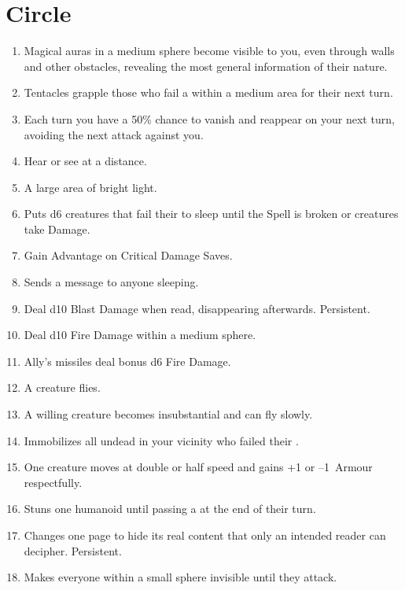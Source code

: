 \documentclass[itdr]{subfiles}
\begin{document}
\section{ Circle}
\def \spellcircle {3}
\begin{enumerate}
	\item {} Magical auras in a medium sphere become visible to you, even through walls and other obstacles, revealing the most general information of their nature.
	\item {} Tentacles grapple those who fail a  within a medium area for their next turn.
	\item {} Each turn you have a 50\% chance to vanish and reappear on your next turn, avoiding the next attack against you.
	\item {} Hear or see at a distance.
	\item {} A large area of bright light.
	\item {} Puts d6 creatures that fail their  to sleep until the Spell is broken or creatures take Damage.
	\item {} Gain Advantage on Critical Damage Saves.
	\item {} Sends a message to anyone sleeping.
	\item {} Deal d10 Blast Damage when read, disappearing afterwards. Persistent.
	\item {} Deal d10 Fire Damage within a medium sphere.
	\item {} Ally's missiles deal bonus d6 Fire Damage.
	\item {} A creature flies.
	\item {} A willing creature becomes insubstantial and can fly slowly.
	\item {} Immobilizes all undead in your vicinity who failed their .
	\item {} One creature moves at double or half speed and gains +1 or --1~Armour respectfully.
	\item {} Stuns one humanoid until passing a  at the end of their turn.
	\item {} Changes one page to hide its real content that only an intended reader can decipher. Persistent.
	\item {} Makes everyone within a small sphere invisible until they attack.

\end{enumerate}
\end{document}
